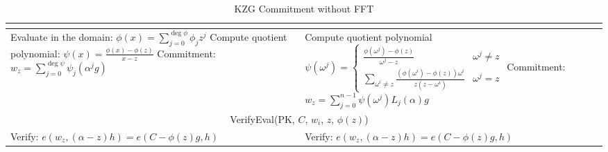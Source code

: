 \begin{table}[!htp]
\begin{tabularx}{\textwidth}{|X|X|X|}
{        } \\ \hline
        Evaluate in the domain: $\displaystyle \phi(x)=\sum_{j=0}^{\deg\phi}\phi_jz^j$ \newline
        Compute quotient polynomial: $\displaystyle \psi(x)=\frac{\phi(x)-\phi(z)}{x-z}$ \newline
        Commitment: $\displaystyle w_z=\sum_{j=0}^{\deg\psi}\psi_j(\alpha^jg)$
        &
        Compute quotient polynomial \newline
        $\displaystyle \psi(\omega^j) = \begin{cases}
            \frac{\phi(\omega^j)-\phi(z)}{\omega^j-z} & \omega^j \ne z \\
            \sum_{\omega^i \ne z}\frac{(\phi(\omega^i)-\phi(z))\omega^i}{z(z-\omega^i)} & \omega^j=z
        \end{cases}$ \newline
        Commitment: $\displaystyle w_z=\sum_{j=0}^{n-1}\psi(\omega^j)L_j(\alpha)g$ \\ \hline
        \multicolumn{2}{|c|}{VerifyEval(PK, $C$, $w_i$, $z$, $\phi(z)$)} \\ \hline
        Verify: $e(w_z, (\alpha-z)h) = e(C-\phi(z)g, h)$
        & Verify: $e(w_z, (\alpha-z)h) = e(C-\phi(z)g, h)$ \\ \hline
    \end{tabularx}
    \caption{KZG Commitment without FFT}
    \label{table:kzg-without-fft}
\end{table}
